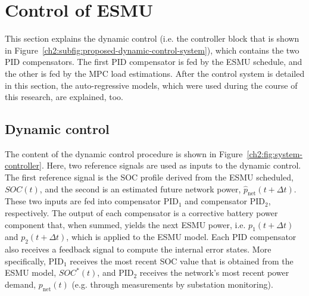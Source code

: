 \section{Control of ESMU}
\label{ch2:sec:control-of-esmu}



This section explains the dynamic control (i.e. the controller block that is shown in Figure~\ref{ch2:subfig:proposed-dynamic-control-system}), which contains the two PID compensators.
The first PID compensator is fed by the ESMU schedule, and the other is fed by the MPC load estimations.
After the control system is detailed in this section, the auto-regressive models, which were used during the course of this research, are explained, too.

\subsection{Dynamic control}

The content of the dynamic control procedure is shown in Figure~\ref{ch2:fig:system-controller}.
Here, two reference signals are used as inputs to the dynamic control.
The first reference signal is the SOC profile derived from the ESMU scheduled, $SOC(t)$, and the second is an estimated future network power, $\hat{p}_\text{net}(t+\Delta t)$.
These two inputs are fed into compensator PID$_1$ and compensator PID$_2$, respectively.
The output of each compensator is a corrective battery power component that, when summed, yields the next ESMU power, i.e. $p_1(t+\Delta t)$ and $p_2(t+\Delta t)$, which is applied to the ESMU model.
Each PID compensator also receives a feedback signal to compute the internal error states.
More specifically, PID$_1$ receives the most recent SOC value that is obtained from the ESMU model, $SOC^*(t)$, and PID$_2$ receives the network's most recent power demand, $p_\text{net}(t)$ (e.g. through measurements by substation monitoring).

